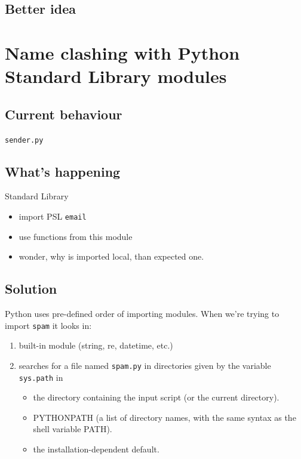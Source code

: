 \documentclass{beamer}
\begin{document}
\subsection{Better idea}
\begin{frame}

\end{frame}

\section{Name clashing with Python Standard Library modules}
\subsection{Current behaviour}
\begin{frame}
\begin{center}
\structure{\insertsection}
\end{center}

\pause \texttt{sender.py}

\pause 
\end{frame}

\subsection{What's happening}
\begin{frame}
Standard Library
\begin{itemize}
\item import PSL \texttt{email}
\item use functions from this module
\item wonder, why is imported local, than expected one.
\end{itemize}
\end{frame}

\subsection{Solution}
\begin{frame}
Python uses pre-defined order of importing modules. When we're trying to import \texttt{spam} it looks in:
\begin{enumerate}
\item built-in module (string, re, datetime, etc.)
\item searches for a file named \texttt{spam.py} in directories given by the variable \texttt{sys.path} in
\begin{itemize}
\item the directory containing the input script (or the current directory).
\item PYTHONPATH (a list of directory names, with the same syntax as the shell variable PATH).
\item the installation-dependent default.
\end{itemize}
\end{enumerate}
\end{frame}
\end{document}
